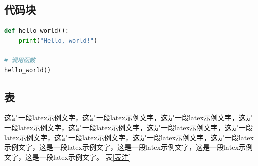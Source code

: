 \documentclass{template} %
\begin{document}
\begin{multicols}{2}

\subsection{代码块}
\begin{lstlisting}[language=Python, caption=示例代码, label=code:example]
def hello_world():
    print("Hello, world!")

# 调用函数
hello_world()
\end{lstlisting}

\subsection{表}
这是一段latex示例文字，这是一段latex示例文字，这是一段latex示例文字，这是一段latex示例文字，这是一段latex示例文字，这是一段latex示例文字，这是一段latex示例文字，这是一段latex示例文字，这是一段latex示例文字，这是一段latex示例文字，这是一段latex示例文字，这是一段latex示例文字，这是一段latex示例文字，这是一段latex示例文字。
表\ref{表注}
\begin{table}[H]
  \centering
  \caption{引用名}
  \label{表注}
  \small
\end{table}
    
    
    
    
    \end{multicols}
    
\end{document}
